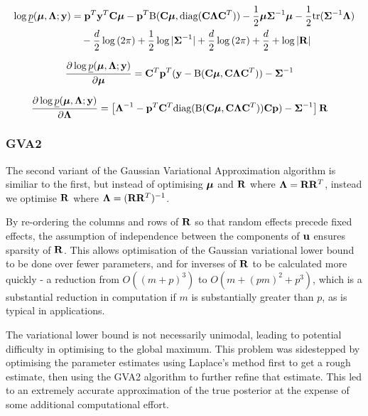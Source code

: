 \documentclass{article}[12pt]
\begin{document}
\begin{align}\label{eq:gva}
\log \underline{p}({\boldsymbol \mu}, {\boldsymbol \Lambda}; {\bf y}) &= {\bf p}^T{\bf y}^T{\bf C} {\boldsymbol \mu} - {\bf p}^T {\text{B}}({\bf C} {\boldsymbol \mu}, \text{diag}({\bf C} {\boldsymbol \Lambda} {\bf C}^T)) - {\frac{1}{2}} {\boldsymbol \mu} {\boldsymbol \Sigma}^{-1} {\boldsymbol \mu} - {\frac{1}{2}} \text{tr}{({\boldsymbol\Sigma}^{-1} {\boldsymbol\Lambda})} \\
&\quad - \frac{d}{2} \log{(2 \pi)} + {\frac{1}{2}} \log{|{\boldsymbol\Sigma}^{-1}|} + \frac{d}{2} \log{(2 \pi)} + \frac{d}{2} + \log{|{\bf R}|}
\end{align}

\begin{align*}
\frac{\partial \log \underline{p}({\boldsymbol \mu}, {\boldsymbol \Lambda}; {\bf y})}{\partial {\boldsymbol\mu}} &= {\bf C}^T {\bf p}^T({\bf y} - {\text{B}}({\bf C} {\boldsymbol \mu}, {\bf C} {\boldsymbol \Lambda} {\bf C}^T)) - {\boldsymbol \Sigma}^{-1}
\end{align*}

\begin{align*}
\frac{\partial \log \underline{p}({\boldsymbol \mu}, {\boldsymbol \Lambda}; {\bf y})}{\partial {\boldsymbol\Lambda}} &= \left [{\boldsymbol \Lambda}^{-1} - {\bf p}^T {\bf C}^T \text{diag}({\text{B}}({\bf C} {\boldsymbol \mu}, {\bf C} {\boldsymbol \Lambda} {\bf C}^T)) {\bf C} {\bf p}) - {\boldsymbol \Sigma}^{-1} \right ] {\bf R}
\end{align*} 
 
\subsubsection{GVA2}
The second variant of the Gaussian Variational Approximation algorithm is similiar 
to the first, but instead of optimising ${\boldsymbol \mu}$ and ${\bf R}$ where ${\boldsymbol \Lambda}={\bf R} {\bf R}^T$,
instead we optimise ${\bf R}$ where ${\boldsymbol \Lambda} = ({\bf R} {\bf R}^T)^{-1}$.

\noindent By re-ordering the columns and rows of ${\bf R}$ so that random effects
precede fixed effects, the assumption of independence between the components of
${\bf u}$ ensures sparsity of ${\bf R}$. This allows optimisation of the Gaussian 
variational lower bound to be done over fewer parameters, and for inverses of ${\bf R}$ 
to be calculated more quickly - a reduction from $O((m + p)^3)$ to
$O(m + (pm)^2 + p^3)$, which is a substantial reduction in computation if $m$ is 
substantially greater than $p$, as is typical in applications.


\noindent The variational lower bound is not necessarily unimodal, leading to 
potential difficulty in optimising to the global maximum. This problem was 
sidestepped by optimising the parameter estimates using Laplace's method first to 
get a rough estimate, then using the GVA2 algorithm to further refine that estimate. 
This led to an extremely accurate approximation of the true posterior at the expense 
of some additional computational effort.
\end{document}
